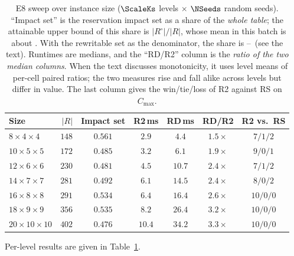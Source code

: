 \begin{table}[t]
\centering
\caption{E8 sweep over instance size (\(\ScaleKs\) levels \(\times\) \(\NSeeds\) random seeds).
``Impact set'' is the reservation impact set as a share of the \emph{whole table}; the attainable upper bound of this share is \(|R^{\circ}|/|R|\), whose mean in this batch is about
\ScaleAliveShare. With the rewritable set as the denominator, the share is \ScaleCloAliveLo--\ScaleCloAliveHi\ (see the text).
Runtimes are medians, and the ``RD/R2'' column is the \emph{ratio of the two median columns}. When the text discusses monotonicity, it uses level means of per-cell paired ratios;
the two measures rise and fall alike across levels but differ in value. The last column gives the win/tie/loss of R2 against RS on \(C_{\max}\).}
\label{tab:instscale}
\small
\begin{tabular}{@{}lrccccc@{}}
\toprule
Size & \(|R|\) & Impact set & R2\,ms & RD\,ms & RD/R2 & R2 vs.\ RS \\
\midrule
\(8\times4\times4\)    & \(148\) & \(0.561\) & \(2.9\)  & \(4.4\)  & \(1.5\times\) & \(7/1/2\) \\
\(10\times5\times5\)   & \(172\) & \(0.485\) & \(3.2\)  & \(6.1\)  & \(1.9\times\) & \(9/0/1\) \\
\(12\times6\times6\)   & \(230\) & \(0.481\) & \(4.5\)  & \(10.7\) & \(2.4\times\) & \(7/1/2\) \\
\(14\times7\times7\)   & \(281\) & \(0.492\) & \(6.1\)  & \(14.5\) & \(2.4\times\) & \(8/0/2\) \\
\(16\times8\times8\)   & \(291\) & \(0.534\) & \(6.4\)  & \(16.4\) & \(2.6\times\) & \(10/0/0\) \\
\(18\times9\times9\)   & \(356\) & \(0.535\) & \(8.2\)  & \(26.4\) & \(3.2\times\) & \(10/0/0\) \\
\(20\times10\times10\) & \(402\) & \(0.476\) & \(10.4\) & \(34.2\) & \(3.3\times\) & \(10/0/0\) \\
\bottomrule
\end{tabular}
\end{table}

Per-level results are given in Table~\ref{tab:instscale}.

